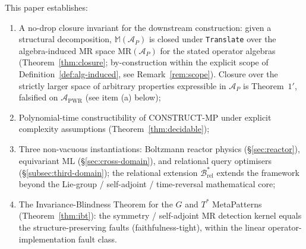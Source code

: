 \documentclass[acmsmall,screen,review]{acmart}
\begin{document}
\begin{tcolorbox}[breakable,colback=gray!5,colframe=black!50,arc=2pt,boxrule=0.5pt,fontupper=\small,title=Boundary of contribution,fonttitle=\small\bfseries]
This paper establishes:
\begin{enumerate}[leftmargin=*,nosep]
  \item A no-drop closure invariant for the downstream construction: given a structural decomposition, $\mathbb{M}(\mathcal{A}_P)$ is closed under \texttt{Translate} over the algebra-induced MR space $\mathrm{MR}(\mathcal{A}_P)$ for the stated operator algebras (Theorem~\ref{thm:closure}; by-construction within the explicit scope of Definition~\ref{def:alg-induced}, see Remark~\ref{rem:scope}). Closure over the strictly larger space of arbitrary properties expressible in $\mathcal{A}_P$ is Theorem~$1'$, falsified on $\mathcal{A}_{\mathrm{PWR}}$ (see item (a) below);
  \item Polynomial-time constructibility of CONSTRUCT-MP under explicit complexity assumptions (Theorem~\ref{thm:decidable});
  \item Three non-vacuous instantiations: Boltzmann reactor physics (\S\ref{sec:reactor}), equivariant ML (\S\ref{sec:cross-domain}), and relational query optimisers (\S\ref{subsec:third-domain}); the relational extension $\mathcal{B}^{*}_{\mathrm{rel}}$ extends the framework beyond the Lie-group / self-adjoint / time-reversal mathematical core;
  \item The Invariance-Blindness Theorem for the $G$ and $T^{*}$ MetaPatterns (Theorem~\ref{thm:ibt}): the symmetry / self-adjoint MR detection kernel equals the structure-preserving faults (faithfulness-tight), within the linear operator-implementation fault class.
\end{enumerate}


\end{tcolorbox}
\end{document}

